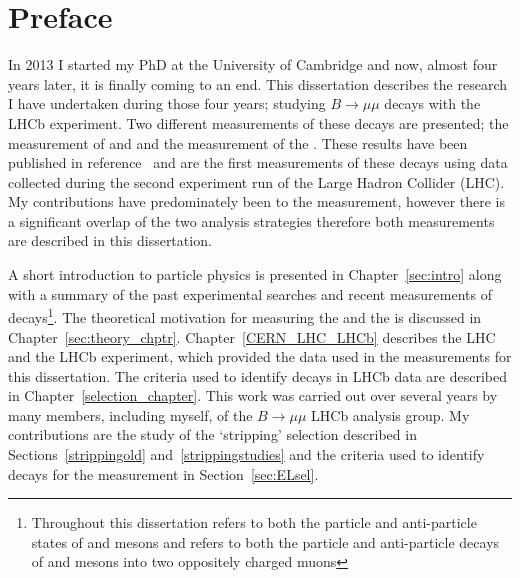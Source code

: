 \chapter{Preface}

In 2013 I started my PhD at the University of Cambridge and now, almost four years later, it is finally coming to an end. This dissertation describes the research I have undertaken during those four years; studying $B \to \mu \mu$ decays with the LHCb experiment. Two different measurements of these decays are presented; the measurement of \bdmumu and \bsmumu \BFs and the measurement of the \bsmumu \el. These results have been published in reference~\cite{Aaij:2017vad} and are the first measurements of these decays using data collected during the second experiment run of the Large Hadron Collider (LHC). My contributions have predominately been to the \el measurement, however there is a significant overlap of the two analysis strategies therefore both measurements are described in this dissertation.

A short introduction to particle physics is presented in Chapter~\ref{sec:intro} along with a summary of the past experimental searches and recent measurements of \bmumu decays\footnote{Throughout this dissertation \bsd refers to both the particle and anti-particle states of \bd and \bs mesons and \bmumu refers to both the particle and anti-particle decays of \bd and \bs mesons into two oppositely charged muons}. The theoretical motivation for measuring the \bmumu \BFs and the \bsmumu \el is discussed in Chapter~\ref{sec:theory_chptr}.
Chapter~\ref{CERN_LHC_LHCb} describes the LHC and the LHCb experiment, which provided the data used in the measurements for this dissertation.
The criteria used to identify \bmumu decays in LHCb data are described in Chapter~\ref{selection_chapter}. This work was carried out over several years by many members, including myself, of the $B \to \mu \mu$ LHCb analysis group. My contributions are the study of the `stripping' selection described in Sections~\ref{strippingold} and~\ref{strippingstudies} and the criteria used to identify \bsmumu decays for the \el measurement in Section~\ref{sec:ELsel}.

